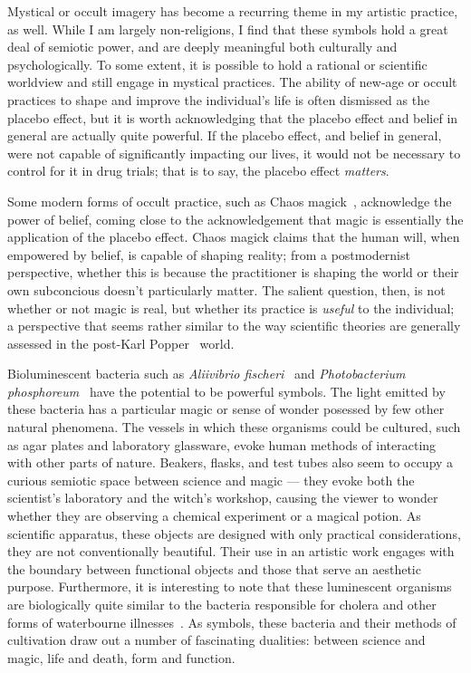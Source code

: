 \documentclass[a4paper,12pt]{article}
\begin{document}
Mystical or occult imagery has become a recurring theme in my artistic practice, as well. While I am largely non-religions, I find that these symbols hold a great deal of semiotic power, and are deeply meaningful both culturally and psychologically. To some extent, it is possible to hold a rational or scientific worldview and still engage in mystical practices. The ability of new-age or occult practices to shape and improve the individual's life is often dismissed as the placebo effect, but it is worth acknowledging that the placebo effect and belief in general are actually quite powerful. If the placebo effect, and belief in general, were not capable of significantly impacting our lives, it would not be necessary to control for it in drug trials; that is to say, the placebo effect \textit{matters}.

Some modern forms of occult practice, such as Chaos magick~\autocite{carroll1987liber,carroll1992liber,sherwin1992book}, acknowledge the power of belief, coming close to the acknowledgement that magic is essentially the application of the placebo effect. Chaos magick claims that the human will, when empowered by belief, is capable of shaping reality; from a postmodernist perspective, whether this is because the practitioner is shaping the world or their own subconcious doesn't particularly matter. The salient question, then, is not whether or not magic is real, but whether its practice is \textit{useful} to the individual; a perspective that seems rather similar to the way scientific theories are generally assessed in the post-Karl Popper~\autocite{popper1999all} world.

Bioluminescent bacteria such as \textit{Aliivibrio fischeri}~\autocite{brock,dictPhotobacterium} and \textit{Photobacterium phosphoreum}~\autocite{dictPhotobacterium} have the potential to be powerful symbols. The light emitted by these bacteria has a particular magic or sense of wonder posessed by few other natural phenomena. The vessels in which these organisms could be cultured, such as agar plates and laboratory glassware, evoke human methods of interacting with other parts of nature. Beakers, flasks, and test tubes also seem to occupy a curious semiotic space between science and magic --- they evoke both the scientist's laboratory and the witch's workshop, causing the viewer to wonder whether they are observing a chemical experiment or a magical potion. As scientific apparatus, these objects are designed with only practical considerations, they are not conventionally beautiful. Their use in an artistic work engages with the boundary between functional objects and those that serve an aesthetic purpose. Furthermore, it is interesting to note that these luminescent organisms are biologically quite similar to the bacteria responsible for cholera and other forms of waterbourne illnesses~\autocite{dictVibrio}. As symbols, these bacteria and their methods of cultivation draw out a number of fascinating dualities: between science and magic, life and death, form and function.
\end{document}
